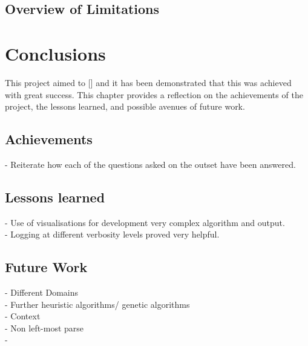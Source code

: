 \documentclass[12pt,a4paper,twoside,openany]{report} \usepackage[pdfborder={0 0 0}]{hyperref}    %
\theoremstyle{definition} \newtheorem{definition}{Definition}[section]
\begin{document}
\section{Overview of Limitations}



      \chapter{Conclusions} 
      This project aimed to [] and it has been demonstrated that this was achieved with great success. 
      This chapter provides a reflection on the achievements of the project, the lessons learned, and possible avenues of future work.

      \section{Achievements}

      - Reiterate how each of the questions asked on the outset have been answered. \\

      \section{Lessons learned}

      - Use of visualisations for development very complex algorithm and output. \\
      - Logging at different verbosity levels proved very helpful. \\

      \section{Future Work}

      - Different Domains \\
      - Further heuristic algorithms/ genetic algorithms \\
      - Context \\
      - Non left-most parse \\
      - 



\end{document}
